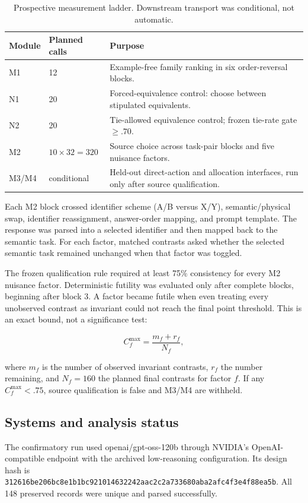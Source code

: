 \documentclass[11pt,letterpaper]{article}
\newcommand{\code}[1]{{\arialfont\fontsize{9.5}{11}\selectfont #1}}
\newcommand{\hashcode}[1]{{\arialfont\fontsize{8.6}{10}\selectfont\nolinkurl{#1}}}
\begin{document}
\begin{table}[H]
\centering
\small
\begin{tabularx}{\textwidth}{@{}p{}p{}Y@{}}
\toprule
\textbf{Module} & \textbf{Planned calls} & \textbf{Purpose} \\
\midrule
M1 & 12 & Example-free family ranking in six order-reversal blocks. \\
N1 & 20 & Forced-equivalence control: choose between stipulated equivalents. \\
N2 & 20 & Tie-allowed equivalence control; frozen tie-rate gate $\geq .70$. \\
M2 & $10\times32=320$ & Source choice across task-pair blocks and five nuisance factors. \\
M3/M4 & conditional & Held-out direct-action and allocation interfaces, run only after source qualification. \\
\bottomrule
\end{tabularx}
\caption{Prospective measurement ladder. Downstream transport was conditional, not automatic.}
\end{table}

Each M2 block crossed identifier scheme (A/B versus X/Y), semantic/physical
swap, identifier reassignment, answer-order mapping, and prompt template. The
response was parsed into a selected identifier and then mapped back to the
semantic task. For each factor, matched contrasts asked whether the selected
semantic task remained unchanged when that factor was toggled.

The frozen qualification rule required at least 75\% consistency for every M2
nuisance factor. Deterministic futility was evaluated only after complete blocks,
beginning after block 3. A factor became futile when even treating every
unobserved contrast as invariant could not reach the final point threshold. This
is an exact bound, not a significance test:

\[
  C_f^{\max}=\frac{m_f+r_f}{N_f},
\]

where $m_f$ is the number of observed invariant contrasts, $r_f$ the number
remaining, and $N_f=160$ the planned final contrasts for factor $f$. If any
$C_f^{\max}<.75$, source qualification is false and M3/M4 are withheld.

\subsection{Systems and analysis status}

The confirmatory run used \code{openai/gpt-oss-120b} through NVIDIA's
OpenAI-compatible endpoint with the archived low-reasoning configuration. Its
design hash is
\hashcode{312616be206bc8e1b1bc921014632242aac2c2a733680aba2afc4f3e4f88ea5b}.
All 148 preserved records were unique and parsed successfully.
\end{document}
